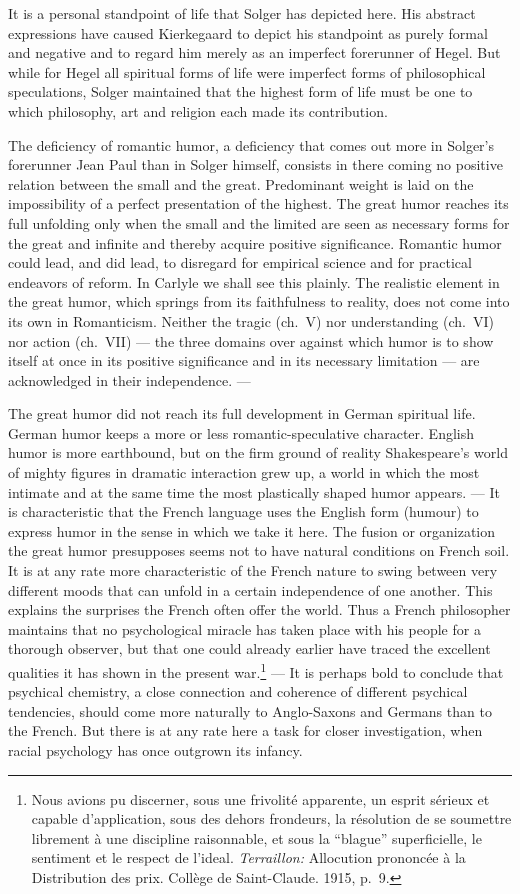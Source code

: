 \documentclass[12pt]{book}
\newcommand{\opage}[1]{\marginnote{\footnotesize\textit{[#1]}}}
\begin{document}
It is a personal standpoint of life that Solger has depicted here. His abstract expressions have
caused Kierkegaard to depict his \opage{164}standpoint as purely formal and negative and to regard
him merely as an imperfect forerunner of Hegel. But while for Hegel all spiritual forms of life
were imperfect forms of philosophical speculations, Solger maintained that the highest form of life
must be one to which philosophy, art and religion each made its contribution.

The deficiency of romantic humor, a deficiency that comes out more in Solger's forerunner Jean Paul
than in Solger himself, consists in there coming no positive relation between the small and the
great. Predominant weight is laid on the impossibility of a perfect presentation of the highest.
The great humor reaches its full unfolding only when the small and the limited are seen as
necessary forms for the great and infinite and thereby acquire positive significance. Romantic
humor could lead, and did lead, to disregard for empirical science and for practical endeavors of
reform. In Carlyle we shall see this plainly. The realistic element in the great humor, which
springs from its faithfulness to reality, does not come into its own in Romanticism. Neither the
tragic (ch.~V) nor understanding (ch.~VI) nor action (ch.~VII) --- the three domains over against
which humor is to show itself at once in its positive significance and in its necessary limitation
--- are acknowledged in their independence. ---

The great humor did not reach its full development in German spiritual life. German humor keeps a
more or less romantic-speculative character. English humor is more earthbound, but on the firm
ground of reality Shakespeare's world of mighty figures in dramatic interaction grew up, a world in
which the most intimate and at the same time the most plastically shaped humor appears. --- It is
characteristic that the French language uses the English form (humour) to express humor in the
sense in which we take it here. The fusion or organization the great humor presupposes seems not to
have natural conditions on French soil. It is at any rate more characteristic of the French nature
to swing between very different moods that can unfold in a certain independence of one another.
This explains the surprises \opage{165}the French often offer the world. Thus a French philosopher
maintains that no psychological miracle has taken place with his people for a thorough observer,
but that one could already earlier have traced the excellent qualities it has shown in the present
war.\footnote{Nous avions pu discerner, sous une frivolité apparente, un esprit sérieux et capable
d'application, sous des dehors frondeurs, la résolution de se soumettre librement à une discipline
raisonnable, et sous la ``blague'' superficielle, le sentiment et le respect de l'ideal.
\textit{Terraillon:} Allocution prononcée à la Distribution des prix. Collège de Saint-Claude. 1915,
p.~9.} --- It is perhaps bold to conclude that psychical chemistry, a close connection and coherence
of different psychical tendencies, should come more naturally to Anglo-Saxons and Germans than to
the French. But there is at any rate here a task for closer investigation, when racial psychology
has once outgrown its infancy.
\end{document}
